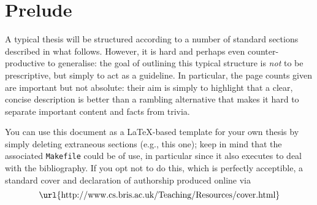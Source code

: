\documentclass[ %
                    author={Luke Murray},
                supervisor={Dr. Simon Hollis},
                     title={Shadow Peer-to-Peer Networks},
                  subtitle={},
                    degree={MEng},
                      year={2013} ]{thesis}
\begin{document}


\section*{Prelude}
\thispagestyle{empty}

A typical thesis will be structured according to a number of standard 
sections described in what follows.  However, it is hard and perhaps
even counter-productive to generalise: the goal of outlining this 
typical structure is {\em not} to be prescriptive, but simply to act 
as a guideline.  In particular, the page counts given are important 
but not absolute: their aim is simply to highlight that a clear, 
concise description is better than a rambling alternative that 
makes it hard to separate important content and facts from trivia.

You can use this document as a \LaTeX-based
template for your own thesis by simply deleting extraneous sections (e.g., 
this one); keep in mind that the associated {\tt Makefile} could be of
use, in particular since it also executes \mbox{\BibTeX} to deal with the
bibliography.  If you opt not to do this, which is perfectly acceptible,
a standard cover and declaration of authorship produced online via
\[
\mbox{\url{http://www.cs.bris.ac.uk/Teaching/Resources/cover.html}}
\]



\maketitle


\frontmatter
\end{document}
